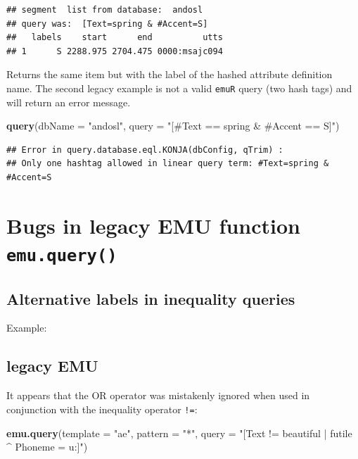 \documentclass[]{book}
\newenvironment{Shaded}{\begin{snugshade}}{\end{snugshade}}
\newcommand{\DataTypeTok}[1]{\textcolor[rgb]{0.13,0.29,0.53}{#1}}
\newcommand{\KeywordTok}[1]{\textcolor[rgb]{0.13,0.29,0.53}{\textbf{#1}}}
\newcommand{\NormalTok}[1]{#1}
\newcommand{\StringTok}[1]{\textcolor[rgb]{0.31,0.60,0.02}{#1}}
\begin{document}
\begin{verbatim}
## segment  list from database:  andosl
## query was:  [Text=spring & #Accent=S]
##   labels    start      end          utts
## 1      S 2288.975 2704.475 0000:msajc094
\end{verbatim}

Returns the same item but with the label of the hashed
attribute definition name. The second legacy example is not a valid
\texttt{emuR} query (two hash tags) and will return an error message.

\begin{Shaded}
\begin{Highlighting}[]
\KeywordTok{query}\NormalTok{(}\DataTypeTok{dbName =} \StringTok{"andosl"}\NormalTok{,}
      \DataTypeTok{query =} \StringTok{"[#Text == spring & #Accent == S]"}\NormalTok{)}
\end{Highlighting}
\end{Shaded}

\begin{verbatim}
## Error in query.database.eql.KONJA(dbConfig, qTrim) :
## Only one hashtag allowed in linear query term: #Text=spring & #Accent=S
\end{verbatim}

\hypertarget{bugs-in-legacy-emu-function-emu.query}{%
\section{\texorpdfstring{Bugs in legacy EMU function \texttt{emu.query()}}{Bugs in legacy EMU function emu.query()}}\label{bugs-in-legacy-emu-function-emu.query}}

\hypertarget{alternative-labels-in-inequality-queries}{%
\subsection{Alternative labels in inequality queries}\label{alternative-labels-in-inequality-queries}}

Example:

\hypertarget{legacy-emu-1}{%
\subsection{legacy EMU}\label{legacy-emu-1}}

It appears that the OR operator \texttt{\textbar{}} was mistakenly ignored when used in conjunction with the inequality operator \texttt{!=}:

\begin{Shaded}
\begin{Highlighting}[]
\KeywordTok{emu.query}\NormalTok{(}\DataTypeTok{template =} \StringTok{"ae"}\NormalTok{,}
          \DataTypeTok{pattern =} \StringTok{"*"}\NormalTok{,}
          \DataTypeTok{query =} \StringTok{"[Text != beautiful | futile ^ Phoneme = u:]"}\NormalTok{)}
\end{Highlighting}
\end{Shaded}
\end{document}
